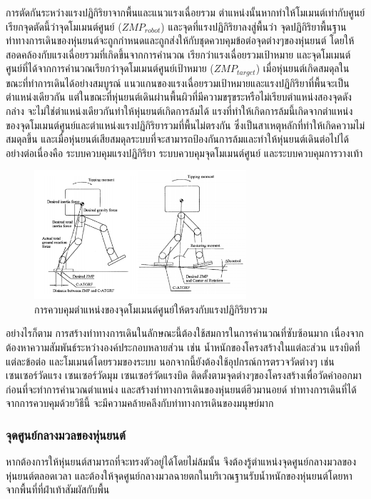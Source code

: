 การตัดกันระหว่างแรงปฏิกิริยาจากพื้นและแนวแรงเฉื่อยรวม ตำแหน่งนั้นหากทำให้โมเมนต์เท่ากับศูนย์
เรียกจุดตัดนี้ว่าจุดโมเมนต์ศูนย์ ($ZMP_{robot}$) และจุดที่แรงปฏิกิริยาลงสู่พื้นว่า จุดปฏิกิริยาพื้นฐาน 
ท่าทางการเดินของหุ่นยนต์จะถูกกำหนดและถูกส่งให้กับชุดควบคุมข้อต่อจุดต่างๆของหุ่นยนต์ โดยให้สอดคล้องกับแรงเฉื่อยรวมที่เกิดขึ้นจากการคำนวณ
เรียกว่าแรงเฉื่อยรวมเป้าหมาย และจุดโมเมนต์ศูนย์ที่ได้จากการคำนวณเรียกว่าจุดโมเมนต์ศูนย์เป้าหมาย ($ZMP_{target}$)
เมื่อหุ่นยนต์เกิดสมดุลในขณะที่ทำการเดินได้อย่างสมบูรณ์ แนวแกนของแรงเฉื่อยรวมเป้าหมายและแรงปฏิกิริยาที่พื้นจะเป็นตำแหน่งเดียวกัน
แต่ในขณะที่หุ่นยนต์เดินผ่านพื้นผิวที่มีความขรุขระหรือไม่เรียบตำแหน่งสองจุดดังกล่าง จะไม่ใช่ตำแหน่งเดียวกันทำให้หุ่นยนต์เกิดการล้มได้
แรงที่ทำให้เกิดการล้มนี้เกิดจากตำแหน่งของจุดโมเมนต์ศูนย์และตำแหน่งแรงปฏิกิริยารวมที่พื้นไม่ตรงกัน ซึ่งเป็นสาเหตุหลักที่ทำให้เกิดความไม่สมดุลขึ้น
และเมื่อหุ่นยนต์เสียสมดุลระบบที่จะสามารถป้องกันการล้มและทำให้หุ่นยนต์เดินต่อไปได้อย่างต่อเนื่องคือ ระบบควบคุมแรงปฏิกิริยา
ระบบควบคุมจุดโมเมนต์ศูนย์ และระบบควบคุมการวางเท้า

\begin{figure}[htbp]
	\centering
	\includegraphics[width=0.7\textwidth]{chapter2/images/zmpdynamicwalking.png}
	\caption{การควบคุมตำแหน่งของจุดโมเมนต์ศูนย์ให้ตรงกับแรงปฏิกิริยารวม}
	\label{fig:robot_zmp_support}
\end{figure}

อย่างไรก็ตาม การสร้างท่าทางการเดินในลักษณะนี้ต้องใช้สมการในการคำนวณที่ซับซ้อนมาก
เนื่องจากต้องหาความสัมพันธ์ระหว่างองค์ประกอบหลายส่วน เช่น น้ำหนักของโครงสร้างในแต่ละส่วน 
แรงบิดที่แต่ละข้อต่อ และโมเมนต์โดยรวมของระบบ นอกจากนี้ยังต้องใช้อุปกรณ์การตรวจวัดต่างๆ เช่น เซนเซอร์วัดแรง
เซนเซอร์วัดมุม เซนเซอร์วัดแรงบิด ติดตั้งตามจุดต่างๆของโครงสร้างเพื่อวัดค่าออกมา ก่อนที่จะทำการคำนวณตำแหน่ง
และสร้างท่าทางการเดินของหุ่นยนต์ฮิวมานอยด์ ท่าทางการเดินที่ได้จากการควบคุมด้วยวิธีนี้ จะมีความคล้ายคลึงกับท่าทางการเดินของมนุษย์มาก

\subsubsection{จุดศูนย์กลางมวลของหุ่นยนต์}
หากต้องการให้หุ่นยนต์สามารถที่จะทรงตัวอยู่ได้โดยไม่ล้มนั้น จึงต้องรู้ตำแหน่งจุดศูนย์กลางมวลของหุ่นยนต์ตลอดเวลา
และต้องให้จุดศูนย์กลางมวลฉายตกในบริเวณฐานรับน้ำหนักของหุ่นยนต์โดยหาจากพื้นที่ที่ฝ่าเท้าสัมผัสกับพื้น
